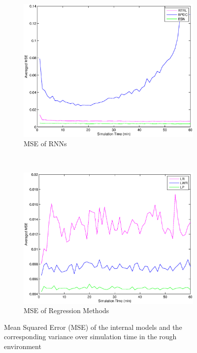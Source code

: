 \documentclass[msc,ai,logo]{infthesis}
\begin{document}
\begin{figure}[H]
        \centering
        \begin{subfigure}[b]{0.5\textwidth}
                \centering
                \includegraphics[width=\textwidth]{RNN_10_MSE.eps}
                \caption{MSE of RNNs}
              \label{fig:RNN_10_MSE}  
        \end{subfigure}%
        ~ %
        \begin{subfigure}[b]{0.5\textwidth}
                \centering
                \includegraphics[width=\textwidth]{LR_10_MSE.eps}
                \caption{MSE of Regression Methods}
               \label{fig:LR_10_MSE}  
        \end{subfigure}
        \caption{Mean Squared Error (MSE) of the internal models and the corresponding variance over simulation time in the rough environment}
        \label{fig:10_MSE}
\end{figure}
\end{document}
